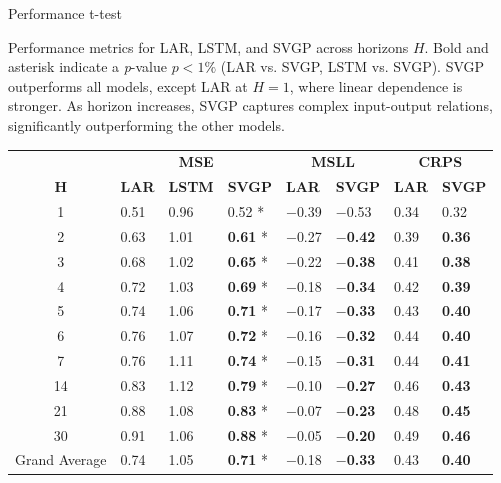 \begin{frame}{Performance t-test}
	\begin{block}{}
	Performance metrics for LAR, LSTM, and SVGP across horizons $H$. Bold and asterisk indicate a \emph{p}-value $p<1\%$ (LAR vs. SVGP, LSTM vs. SVGP). SVGP outperforms all models, except LAR at $H=1$, where linear dependence is stronger. As horizon increases, SVGP captures complex input-output relations, significantly outperforming the other models.
	\end{block}
	\scriptsize
	\begin{table}[htbp]
		\begin{tabular}{c p{1cm}p{1.0cm}p{1.0cm}p{1.0cm}p{1.0cm}p{1.0cm}p{1.0cm}}
			\toprule
			& \multicolumn{3}{c}{\textbf{MSE}} & \multicolumn{2}{c}{\textbf{MSLL}} & \multicolumn{2}{c}{\textbf{CRPS}} \\
			\cmidrule{2-8}
			\( \textbf{H} \) & \textbf{LAR} & \textbf{LSTM} & \textbf{SVGP} & \textbf{LAR} & \textbf{SVGP} & \textbf{LAR} & \textbf{SVGP} \\
			\midrule
			1  & 0.51 & 0.96 & 0.52 * & $-$0.39 & $-$0.53 & 0.34 & 0.32 \\
			2  & 0.63 & 1.01 & \textbf{0.61} * & $-$0.27 & \textbf{$-$0.42} & 0.39 & \textbf{0.36} \\
			3  & 0.68 & 1.02 & \textbf{0.65} * & $-$0.22 & \textbf{$-$0.38} & 0.41 & \textbf{0.38} \\
			4  & 0.72 & 1.03 & \textbf{0.69} * & $-$0.18 & \textbf{$-$0.34} & 0.42 & \textbf{0.39} \\
			5  & 0.74 & 1.06 & \textbf{0.71} * & $-$0.17 & \textbf{$-$0.33} & 0.43 & \textbf{0.40} \\
			6  & 0.76 & 1.07 & \textbf{0.72} * & $-$0.16 & \textbf{$-$0.32} & 0.44 & \textbf{0.40} \\
			7  & 0.76 & 1.11 & \textbf{0.74} * & $-$0.15 & \textbf{$-$0.31} & 0.44 & \textbf{0.41} \\
			14 & 0.83 & 1.12 & \textbf{0.79} * & $-$0.10 & \textbf{$-$0.27} & 0.46 & \textbf{0.43} \\
			21 & 0.88 & 1.08 & \textbf{0.83} * & $-$0.07 & \textbf{$-$0.23} & 0.48 & \textbf{0.45} \\
			30 & 0.91 & 1.06 & \textbf{0.88} * & $-$0.05 & \textbf{$-$0.20} & 0.49 & \textbf{0.46} \\
			\midrule
			Grand Average & 0.74 & 1.05 & \textbf{0.71} * & $-$0.18 & \textbf{$-$0.33} & 0.43 & \textbf{0.40} \\
			\bottomrule
		\end{tabular}
		
	\end{table}
\end{frame}

